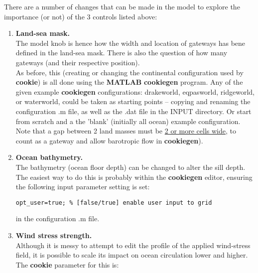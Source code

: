 There are a number of changes that can be made in the model to explore the importance (or not) of the 3 controls listed above:
\vspace{1mm}

\begin{enumerate}
\vspace{1mm}
\item \textbf{Land-sea mask.}
\\The model knob is hence how the width and location of gateways has bene defined in the land-sea mask. There is also the question of how many gateways (and their respective position).
\\As before, this (creating or changing the continental configuration used by \textbf{cookie}) is all done using the \textbf{MATLAB} \textbf{cookiegen} program. Any of the given example \textbf{cookiegen} configurations: \textsf{drakeworld}, \textsf{eqpasworld}, \textsf{ridgeworld}, or \textsf{waterworld}, could be taken as starting points -- copying and renaming the configuration \textsf{.m} file, as well as the \textsf{.dat} file in the \textsf{INPUT} directory.
Or start from scratch and a the 'blank' (initially all ocean) example configuration.\vspace{1mm}
\\Note that a gap between 2 land masses must be \uline{2 or more cells wide}, to count as a gateway and allow barotropic flow in \textbf{cookiegen}).
\vspace{1mm}
\item \textbf{Ocean bathymetry.}
\\The bathymetry (ocean floor depth) can be changed to alter the sill depth. The easiest way to do this is probably within the \textbf{cookiegen} editor, ensuring the following input parameter setting is set:
\vspace{-2pt}\begin{verbatim}
opt_user=true; % [false/true] enable user input to grid
\end{verbatim}\vspace{-2pt}
in the configuration \textsf{.m} file.
\vspace{1mm}
\item \textbf{Wind stress strength.}
\\Although it is messy to attempt to edit the profile of the applied wind-stress field, it is possible to scale its impact on ocean circulation lower and higher. The \textbf{cookie} parameter for this is:
\vspace{-2pt}\begin{verbatim}

\end{verbatim}
\end{enumerate}
